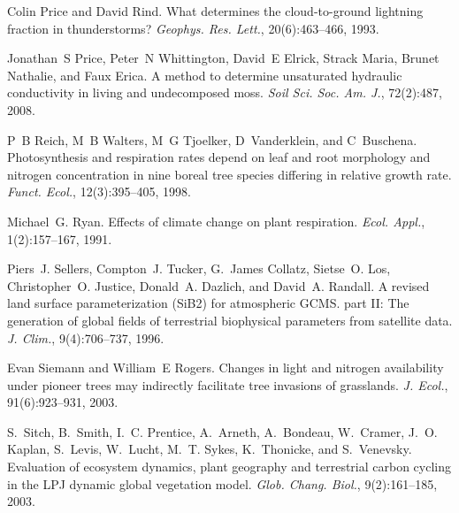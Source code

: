 \begin{DoxyDescription}
\item[\label{_CITEREF_Price1993-fm}%
\mbox{[}65\mbox{]}]Colin Price and David Rind. What determines the cloud-\/to-\/ground lightning fraction in thunderstorms? {\itshape Geophys. Res. Lett.}, 20(6)\+:463--466, 1993. 


\item[\label{_CITEREF_Price2008-fr}%
\mbox{[}66\mbox{]}]Jonathan~S Price, Peter~N Whittington, David~E Elrick, Strack Maria, Brunet Nathalie, and Faux Erica. A method to determine unsaturated hydraulic conductivity in living and undecomposed moss. {\itshape Soil Sci. Soc. Am. J.}, 72(2)\+:487, 2008. 


\item[\label{_CITEREF_Reich1998-zr}%
\mbox{[}67\mbox{]}]P~B Reich, M~B Walters, M~G Tjoelker, D~Vanderklein, and C~Buschena. Photosynthesis and respiration rates depend on leaf and root morphology and nitrogen concentration in nine boreal tree species differing in relative growth rate. {\itshape Funct. Ecol.}, 12(3)\+:395--405, 1998. 


\item[\label{_CITEREF_Ryan1991-ai}%
\mbox{[}68\mbox{]}]Michael~G. Ryan. Effects of climate change on plant respiration. {\itshape Ecol. Appl.}, 1(2)\+:157--167, 1991. 


\item[\label{_CITEREF_Sellers1996-bh}%
\mbox{[}69\mbox{]}]Piers~J. Sellers, Compton~J. Tucker, G.~James Collatz, Sietse~O. Los, Christopher~O. Justice, Donald~A. Dazlich, and David~A. Randall. A revised land surface parameterization (Si\+B2) for atmospheric G\+C\+M\+S. part I\+I\+: The generation of global fields of terrestrial biophysical parameters from satellite data. {\itshape J. Clim.}, 9(4)\+:706--737, 1996. 


\item[\label{_CITEREF_Siemann2003-jl}%
\mbox{[}70\mbox{]}]Evan Siemann and William~E Rogers. Changes in light and nitrogen availability under pioneer trees may indirectly facilitate tree invasions of grasslands. {\itshape J. Ecol.}, 91(6)\+:923--931, 2003. 


\item[\label{_CITEREF_Sitch2003-847}%
\mbox{[}71\mbox{]}]S.~Sitch, B.~Smith, I.~C. Prentice, A.~Arneth, A.~Bondeau, W.~Cramer, J.~O. Kaplan, S.~Levis, W.~Lucht, M.~T. Sykes, K.~Thonicke, and S.~Venevsky. Evaluation of ecosystem dynamics, plant geography and terrestrial carbon cycling in the L\+P\+J dynamic global vegetation model. {\itshape Glob. Chang. Biol.}, 9(2)\+:161--185, 2003. 



\end{DoxyDescription}
